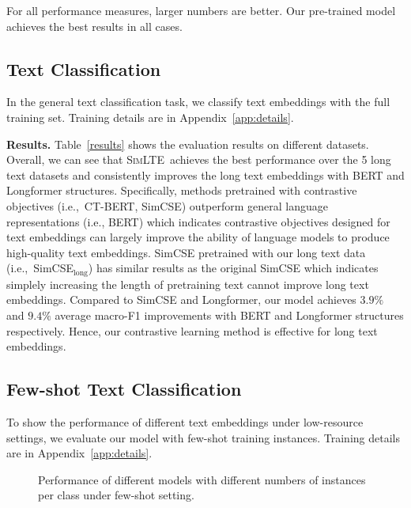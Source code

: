 \documentclass[11pt]{article}
\newcommand{\our}{\mbox{\textsc{SimLTE}}}
\begin{document}
\begin{table}
    \centering
\scalebox{0.7}{
\setlength{\tabcolsep}{1.mm}{
    
    }}
    \caption{For all performance measures, larger numbers are better. Our pre-trained model achieves the best results in all cases.}
    \label{results}
\end{table}

\subsection{Text Classification}
In the general text classification task, we classify text embeddings with the full training set. 
Training details are in Appendix~\ref{app:details}.

\textbf{Results.}
Table~\ref{results} shows the evaluation results on different datasets. 
Overall, we can see that \our~achieves the best performance over the 5 long text datasets and consistently improves the long text embeddings with BERT and Longformer structures. 
Specifically, methods pretrained with contrastive objectives (i.e.,~CT-BERT, SimCSE) outperform general language representations (i.e., BERT) which indicates contrastive objectives designed for text embeddings can largely improve the ability of language models to produce high-quality text embeddings. SimCSE pretrained with our long text data (i.e.,~SimCSE$_{\mathrm{long}}$) has similar results as the original SimCSE which indicates simplely increasing the length of pretraining text cannot improve long text embeddings.
Compared to SimCSE and Longformer, our model achieves $3.9\%$ and $9.4\%$ average macro-F1 improvements with BERT and Longformer structures respectively. Hence, our contrastive learning method is effective for long text embeddings.



\subsection{Few-shot Text Classification}
To show the performance of different text embeddings under low-resource settings, we evaluate our model with few-shot training instances.
Training details are in Appendix~\ref{app:details}.

\begin{figure}
\centering
\caption{Performance of different models with different numbers of instances per class under few-shot setting.}
\label{few_shot}
\end{figure}
\end{document}

